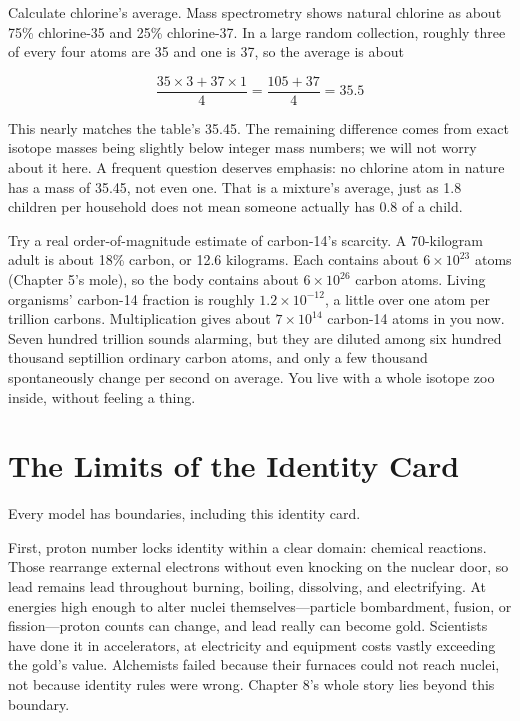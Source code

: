 \begin{qiaoliang}
Calculate chlorine's average. Mass spectrometry shows natural chlorine as about 75\% chlorine-35 and 25\% chlorine-37. In a large random collection, roughly three of every four atoms are 35 and one is 37, so the average is about

\[\frac{35\times 3 + 37\times 1}{4} = \frac{105+37}{4} = 35.5\]

This nearly matches the table's 35.45. The remaining difference comes from exact isotope masses being slightly below integer mass numbers; we will not worry about it here. A frequent question deserves emphasis: no chlorine atom in nature has a mass of 35.45, not even one. That is a mixture's average, just as 1.8 children per household does not mean someone actually has 0.8 of a child.
\end{qiaoliang}

Try a real order-of-magnitude estimate of carbon-14's scarcity. A 70-kilogram adult is about 18\% carbon, or 12.6 kilograms. Each  contains about $6\times 10^{23}$ atoms (Chapter 5's mole), so the body contains about $6\times 10^{26}$ carbon atoms. Living organisms' carbon-14 fraction is roughly $1.2\times 10^{-12}$, a little over one atom per trillion carbons. Multiplication gives about $7\times 10^{14}$ carbon-14 atoms in you now. Seven hundred trillion sounds alarming, but they are diluted among six hundred thousand septillion ordinary carbon atoms, and only a few thousand spontaneously change per second on average. You live with a whole isotope zoo inside, without feeling a thing.

\section{The Limits of the Identity Card}

Every model has boundaries, including this identity card.

First, proton number locks identity within a clear domain: chemical reactions. Those rearrange external electrons without even knocking on the nuclear door, so lead remains lead throughout burning, boiling, dissolving, and electrifying. At energies high enough to alter nuclei themselves---particle bombardment, fusion, or fission---proton counts can change, and lead really can become gold. Scientists have done it in accelerators, at electricity and equipment costs vastly exceeding the gold's value. Alchemists failed because their furnaces could not reach nuclei, not because identity rules were wrong. Chapter 8's whole story lies beyond this boundary.

